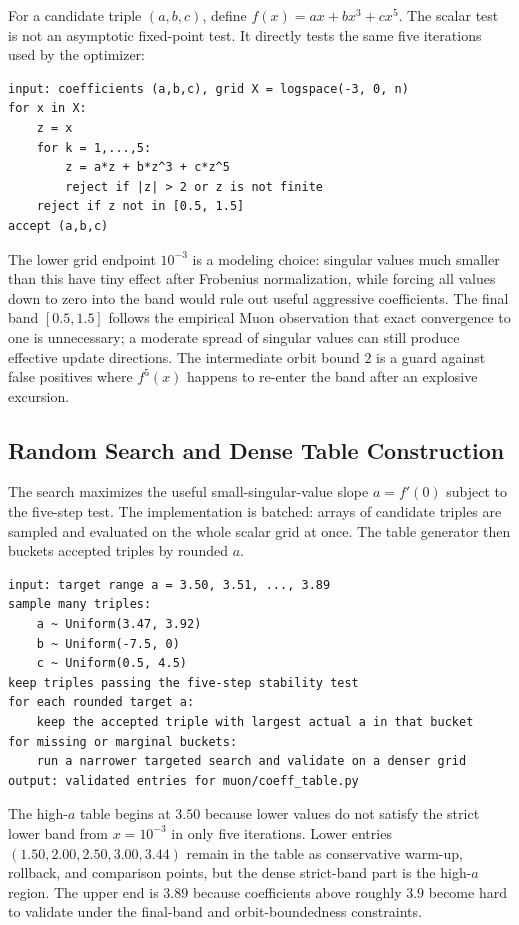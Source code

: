 \documentclass[11pt]{article}
\begin{document}
For a candidate triple $(a,b,c)$, define $f(x)=ax+bx^3+cx^5$. The scalar test is
not an asymptotic fixed-point test. It directly tests the same five iterations
used by the optimizer:
\begin{verbatim}
input: coefficients (a,b,c), grid X = logspace(-3, 0, n)
for x in X:
    z = x
    for k = 1,...,5:
        z = a*z + b*z^3 + c*z^5
        reject if |z| > 2 or z is not finite
    reject if z not in [0.5, 1.5]
accept (a,b,c)
\end{verbatim}
The lower grid endpoint $10^{-3}$ is a modeling choice: singular values much
smaller than this have tiny effect after Frobenius normalization, while forcing
all values down to zero into the band would rule out useful aggressive
coefficients. The final band $[0.5,1.5]$ follows the empirical Muon observation
that exact convergence to one is unnecessary; a moderate spread of singular
values can still produce effective update directions. The intermediate orbit
bound $2$ is a guard against false positives where $f^5(x)$ happens to re-enter
the band after an explosive excursion.

\subsection{Random Search and Dense Table Construction}

The search maximizes the useful small-singular-value slope $a=f'(0)$ subject to
the five-step test. The implementation is batched: arrays of candidate triples
are sampled and evaluated on the whole scalar grid at once. The table generator
then buckets accepted triples by rounded $a$.
\begin{verbatim}
input: target range a = 3.50, 3.51, ..., 3.89
sample many triples:
    a ~ Uniform(3.47, 3.92)
    b ~ Uniform(-7.5, 0)
    c ~ Uniform(0.5, 4.5)
keep triples passing the five-step stability test
for each rounded target a:
    keep the accepted triple with largest actual a in that bucket
for missing or marginal buckets:
    run a narrower targeted search and validate on a denser grid
output: validated entries for muon/coeff_table.py
\end{verbatim}
The high-$a$ table begins at $3.50$ because lower values do not satisfy the
strict lower band from $x=10^{-3}$ in only five iterations. Lower entries
$(1.50,2.00,2.50,3.00,3.44)$ remain in the table as conservative warm-up,
rollback, and comparison points, but the dense strict-band part is the high-$a$
region. The upper end is $3.89$ because coefficients above roughly $3.9$ become
hard to validate under the final-band and orbit-boundedness constraints.
\end{document}
